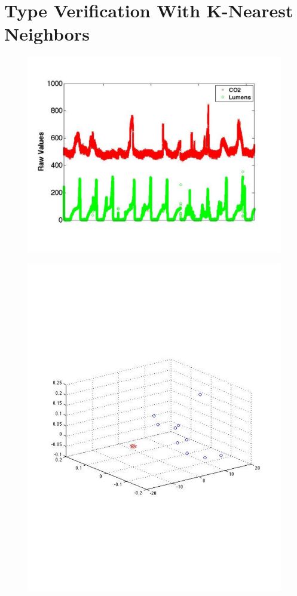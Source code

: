 \section{Type Verification With K-Nearest Neighbors}


\begin{figure}[t!] %
\centering
\includegraphics[width=0.75\columnwidth]{figs/KETI413_co2_light_raw}
\caption{}
\label{fig:co2_light_raw}
\end{figure}

\begin{figure}[t!] %
\centering
\includegraphics[width=0.75\columnwidth]{figs/EMD_LF_PCA_413_co2_light}
\caption{}
\label{fig:EMD_LF_PCA}
\end{figure}

